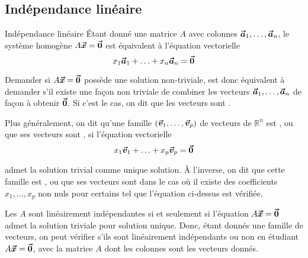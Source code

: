 \documentclass{article}
\begin{document}
\subsection{Indépendance linéaire}
\begin{parag}{Indépendance linéaire}
    Étant donné une matrice $A$ avec colonnes $\bm{\protect\vec{a}}_1, \ldots, \bm{\protect\vec{a}}_n$, le système homogène $A \bm{\protect\vec{x}} = \bm{\protect\vec{0}}$ est équivalent à l'équation vectorielle 
    \[x_1 \bm{\protect\vec{a}}_1 + \ldots + x_n \bm{\protect\vec{a}}_n = \bm{\protect\vec{0}}\]
    
    Demander si $A \bm{\protect\vec{x}} = \bm{\protect\vec{0}}$ possède une solution non-triviale, est donc équivalent à demander s'il existe une façon non triviale de combiner les vecteurs $\bm{\protect\vec{a}}_1, \ldots, \bm{\protect\vec{a}}_n$ de façon à obtenir $\bm{\protect\vec{0}}$. Si c'est le cas, on dit que les vecteurs sont .

    Plus généralement, on dit qu'une famille $\left(\bvec{v}_1, \ldots, \bvec{v}_p\right)$ de vecteurs de $\mathbb{R}^n$ est , ou que ses vecteurs sont , si l'équation vectorielle 
    \[x_1 \bm{\protect\vec{v}}_1 + \ldots + x_p \bm{\protect\vec{v}}_p = \bm{\protect\vec{0}}\]
    
    admet la solution trivial comme unique solution. À l'inverse, on dit que cette famille est , ou que ses vecteurs sont  dans le cas où il existe des coefficients $x_1, \ldots, x_p$ non nuls pour certains tel que l'équation ci-dessus est vérifiée. 

    Les  $A$ sont linéairement indépendantes si et seulement si l'équation $A \bm{\protect\vec{x}} = \bm{\protect\vec{0}}$ admet la solution triviale pour solution unique. Donc, étant donnés une famille de vecteurs, on peut vérifier s'ils sont linéairement indépendants ou non en étudiant $A \bm{\protect\vec{x}} = \bm{\protect\vec{0}}$, avec la matrice $A$ dont les colonnes sont les vecteurs donnés.
\end{parag}
\end{document}
